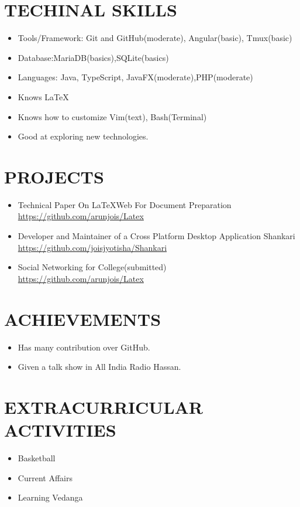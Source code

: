 \documentclass{res}
\begin{document}
\begin{resume}
		\section{TECHINAL SKILLS}
		\begin{itemize}
			\item Tools/Framework: Git and GitHub(moderate),  Angular(basic), Tmux(basic)
			\item Database:MariaDB(basics),SQLite(basics)
			\item Languages: Java, TypeScript, JavaFX(moderate),PHP(moderate) 
			\item Knows \LaTeX
			\item Knows how to customize Vim(text), Bash(Terminal)
			\item Good at exploring new technologies.
		\end{itemize}        
		
		
		\section{PROJECTS}
		\begin{itemize}
			\item Technical Paper On \LaTeX Web For Document Preparation \\
			\href {https://github.com/arunjois/Latex}{https://github.com/arunjois/Latex}
			
			\item Developer and Maintainer of a Cross Platform Desktop Application Shankari\\
			\href {https://github.com/joisjotisha/Shankari}{https://github.com/joisjyotisha/Shankari}
			
			\item Social Networking for College(submitted) \\
			\href{https://github.com/arunjois/Latex}{https://github.com/arunjois/Latex}
		\end{itemize}          
		\section{ACHIEVEMENTS}
		\begin{itemize}
			\item Has many contribution over GitHub.
			\item Given a talk show in All India Radio Hassan. 
		\end{itemize} 
		\section{EXTRACURRICULAR ACTIVITIES}
		\begin{itemize}
			\item Basketball
			\item Current Affairs
			\item Learning Vedanga
		\end{itemize}       
		
	\end{resume}
\end{document}

